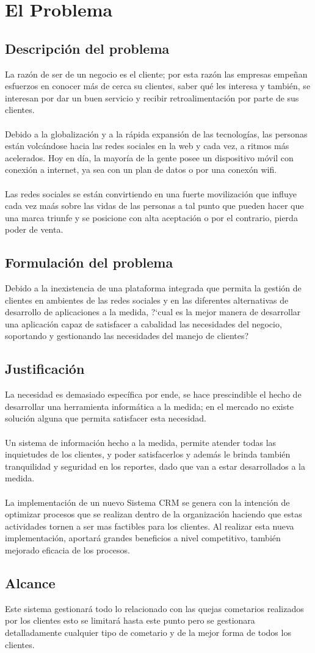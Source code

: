 \chapter{El Problema}\label{Problema}
\section{Descripci\'on del problema}
La raz\'on de ser de un negocio es el cliente; por esta raz\'on las empresas empe\~nan esfuerzos en conocer m\'as de cerca su clientes, saber qu\'e les interesa y tambi\'en, se interesan por dar un buen servicio y recibir retroalimentaci\'on por parte de sus clientes.%
\\%
\\%
Debido a la globalizaci\'on y a la r\'apida expansi\'on de las tecnolog\'ias, las personas est\'an volc\'andose hacia las redes sociales en la web y cada vez, a ritmos m\'as acelerados. Hoy en d\'ia, la mayor\'ia de la gente posee un dispositivo m\'ovil con conexi\'on a internet, ya sea con un plan de datos o por una conex\'on wifi.%
\\%
\\%
Las redes sociales se est\'an convirtiendo en una fuerte movilizaci\'on que influye cada vez ma\'as sobre las vidas de las personas a tal punto que pueden hacer que una marca triunfe y se posicione con alta aceptaci\'on o por el contrario, pierda poder de venta.%
%
\section{Formulaci\'on del problema}
Debido a la inexistencia de una plataforma integrada que permita la gesti\'on de clientes en ambientes de las redes sociales y en las diferentes alternativas de desarrollo de aplicaciones a la medida, ?`cual es la mejor manera de desarrollar una aplicaci\'on capaz de satisfacer a cabalidad las necesidades del negocio, soportando y gestionando las necesidades del manejo de clientes?%
%
\section{Justificaci\'on}
La necesidad es demasiado espec\'ifica por ende, se hace prescindible el hecho de desarrollar una herramienta inform\'atica a la medida; en el mercado no existe soluci\'on alguna que permita satisfacer esta necesidad.%
\\%
\\%
Un sistema de informaci\'on hecho a la medida, permite atender todas las inquietudes de los  clientes, y poder satisfacerlos y adem\'as le brinda tambi\'en tranquilidad y seguridad en los reportes, dado que van a estar desarrollados a la medida.%
\\%
\\%
La implementaci\'on de un nuevo Sistema CRM se genera con la intenci\'on de optimizar procesos que se realizan dentro de la organizaci\'on haciendo que estas actividades tornen a ser mas factibles para los clientes. Al realizar esta nueva implementaci\'on, aportar\'a grandes beneficios a nivel competitivo, tambi\'en mejorado eficacia de los procesos.
%
\section{Alcance}
Este sistema gestionar\'a todo lo relacionado con las quejas cometarios realizados por los clientes esto se limitar\'a hasta este punto pero se gestionara detalladamente cualquier tipo de cometario y de la mejor forma de todos los clientes.%